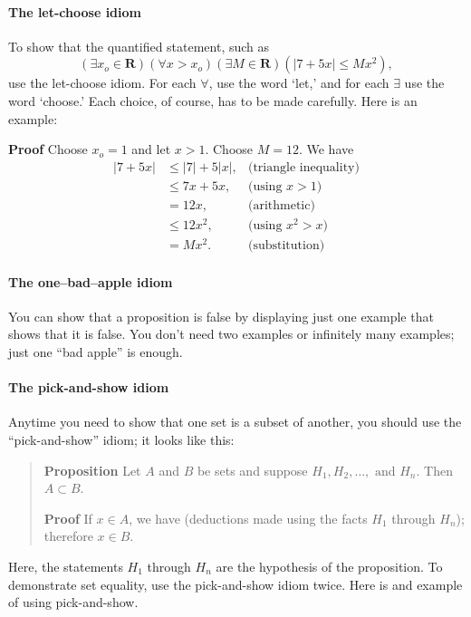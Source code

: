 \documentclass[12pt,fleqn]{article}
\newcommand{\reals}{\mathbf{R}}
\newcounter{ex}\setcounter{ex}{0}
\newcounter{id}\setcounter{id}{0}
\newcounter{se}\setcounter{se}{0}
\begin{document}
\paragraph{The let-choose idiom}

To show that the quantified statement, such as
\begin{equation*}
  \left(\exists x_o \in \reals \right) \left(\forall x > x_o\right) 
\left(\exists M \in \reals \right)  \left(|7 + 5 x| \leq M x^2\right),
\end{equation*}
use the let-choose idiom. For each \(\forall\), use the word `let,' and for each \(\exists\) use the word `choose.' 
Each choice, of course, has to be made carefully. Here is an example:

\noindent \textbf{Proof} Choose \(x_o = 1\) and let \(x > 1\). Choose \(M = 12\).  We have
\begin{align*}
  |7 + 5 x| &\leq |7| + 5 |x|, &\mbox{(triangle inequality)} \\
            &\leq 7 x + 5 x,   &\mbox{(using } x > 1) \\
            &= 12 x,        &\mbox{(arithmetic)} \\
            &\leq 12 x^2,   &\mbox{(using } x^2 > x) \\
            &= M x^2.       &\mbox{(substitution)} 
\end{align*}



\paragraph{The one--bad--apple idiom}

You can show that a proposition is false by displaying just
one example that shows that it is false. You don't need two examples
or infinitely many examples; just one ``bad apple'' is enough.  





\paragraph{The pick-and-show idiom}

Anytime you need to show that one set is a subset of another, you should use the
``pick-and-show'' idiom; it looks like this:

\begin{quote}

\textbf{Proposition} Let \(A\) and \(B\) be sets and suppose \(H_1, H_2 , \dots
,\mbox{ and } H_n\). Then  \(A \subset B\).

\vspace{0.1in}

\textbf{Proof} If \(x \in A\), we have (deductions made using the 
facts \(H_1\) through \(H_n\)); therefore \(x \in B\).

\end{quote}
Here, the statements \(H_1\) through \(H_n\) are the hypothesis of the
proposition. To demonstrate set equality, use the pick-and-show idiom twice. Here
is and example of using pick-and-show.
\end{document}
